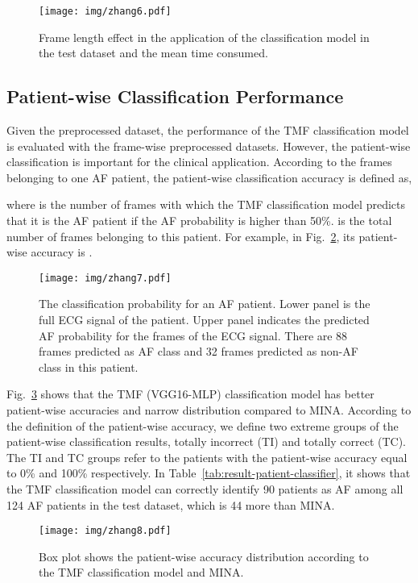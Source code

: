 \documentclass[journal]{IEEEtran}
\begin{document}
\begin{figure}[ht]
  \centering
  \texttt{[image: img/zhang6.pdf]}
  \caption{Frame length effect in the application of the classification model in the test dataset and the mean time consumed.}
  \label{fig:length_effect}
\end{figure}

\subsection{Patient-wise Classification Performance}\label{patient-wise}
Given the preprocessed dataset, the performance of the TMF classification model is evaluated with the frame-wise preprocessed datasets. 
However, the patient-wise classification is important for the clinical application. According to the frames belonging to one AF patient, the patient-wise classification accuracy is defined as,

where  is the number of frames with which the TMF classification model predicts that it is the AF patient if the AF probability  is higher than 50\%.  is the total number of frames belonging to this patient.  For example, in Fig.~\ref{fig:patient-segment}, its patient-wise accuracy is .

\begin{figure}[ht]
  \centering
  \texttt{[image: img/zhang7.pdf]}
  \caption{The classification probability  for an AF patient. Lower panel is the full ECG signal of the patient. Upper panel indicates the predicted AF probability  for the frames of the ECG signal. There are 88 frames predicted as AF class and 32 frames predicted as non-AF class in this patient. }
  \label{fig:patient-segment}
\end{figure}


Fig.~\ref{fig:patient-box-plot} shows that the TMF (VGG16-MLP) classification model has better patient-wise accuracies and narrow distribution compared to MINA. According to the definition of the patient-wise accuracy, we define two extreme groups of the patient-wise classification results, totally incorrect (TI) and totally correct (TC). The TI and TC groups refer to the patients with the patient-wise accuracy equal to 0\% and 100\% respectively. In Table~\ref{tab:result-patient-classifier}, it shows that the TMF classification model can correctly identify 90 patients as AF among all 124 AF patients in the test dataset, which is 44 more than MINA.

\begin{figure}[H]
  \centering
  \texttt{[image: img/zhang8.pdf]}
  \caption{Box plot shows the patient-wise accuracy distribution according to the TMF classification model and MINA.}
  \label{fig:patient-box-plot}
\end{figure}
\end{document}
